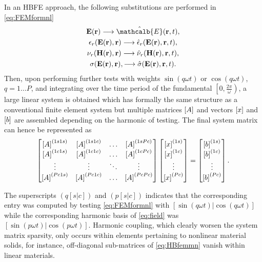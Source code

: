 In an HBFE approach, the following substitutions are performed in \eqref{eq:FEMformnl} 
\begin{gather*}
 \mathbf{E}(\mathbf{r}) \longrightarrow \hat{\mathcalb{E}}(\mathbf{r}, t), \\
 \epsilon_r(\mathbf{E}(\mathbf{r}),\mathbf{r}) \longrightarrow \hat{\epsilon}_r(\mathbf{E}(\mathbf{r}),\mathbf{r}, t),\\
\nu_r(\mathbf{H}(\mathbf{r}),\mathbf{r}) \longrightarrow \hat{\nu}_r(\mathbf{H}(\mathbf{r}),\mathbf{r}, t),\\
\sigma(\mathbf{E}(\mathbf{r}),\mathbf{r}), \longrightarrow \hat{\sigma}(\mathbf{E}(\mathbf{r}),\mathbf{r}, t).
\end{gather*}
Then, upon performing further tests with weights $\sin(q \omega t)$ or $\cos(q \omega t)$, $q = 1 \dots P$, and integrating over the time period of the fundamental $\left [ 0,\frac{2\pi}{\omega} \right )$,  a large linear system is obtained which has formally the same structure as a conventional finite element system but multiple matrices $\left[A\right]$ and vectors $ \left[{{x}}\right]$ and $\left[{{b}}\right]$ are assembled depending on the harmonic of testing. The final system matrix can hence be represented as
%
\begin{equation}\label{eq:HBfemmn}
\begin{bmatrix}
\left[A\right]^{(1s1s)} & \left[A\right]^{(1s1c)} & \ldots &  \left[A\right]^{(1sPc)} \\
\left[A\right]^{(1c1s)} & \left[A\right]^{(1c1c)} & \ldots &  \left[A\right]^{(1cPc)} \\
\vdots & \vdots & \ddots & \vdots \\
\left[A\right]^{(Pc1s)} & \left[A\right]^{(Pc1c)} & \ldots &  \left[A\right]^{(PcPc)}
\end{bmatrix}
\begin{bmatrix}
\left[{{x}}\right]^{(1s)} \\
\left[{{x}}\right]^{(1c)} \\
\vdots \\
\left[{{x}}\right]^{(Pc)}
\end{bmatrix}
=
\begin{bmatrix}
\left[{{b}}\right]^{(1s)}\\
\left[{{b}}\right]^{(1c)}\\
\vdots\\
\left[{{b}}\right]^{(Pc)}
\end{bmatrix}.
\end{equation}

\noindent The superscripts $(q[s|c])$ and $(p[s|c])$ indicates that the corresponding
entry was computed by testing \eqref{eq:FEMformnl} with $[\sin(q \omega t) | \cos(q \omega t)]$ while the corresponding harmonic basis of \eqref{eq:field}
was $[\sin(p \omega t) | \cos(p \omega t)]$. Harmonic coupling, which clearly worsen the system matrix sparsity, only occurs within elements pertaining to nonlinear material solids, for instance, off-diagonal sub-matrices of \eqref{eq:HBfemmn} vanish within linear materials.

